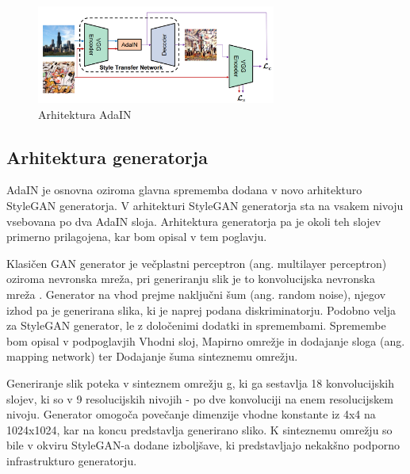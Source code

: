 \documentclass[a4paper,12pt,openright]{book}
\begin{document}
\begin{figure}[htb]
\begin{center}
  \includegraphics[width=0.7\textwidth]{images/adain_architecture.png}
\end{center}
  \caption{Arhitektura AdaIN}
  \label{AdaIN}
\end{figure}


\subsection{Arhitektura generatorja}
AdaIN je osnovna oziroma glavna sprememba dodana v novo arhitekturo StyleGAN generatorja. 
V arhitekturi StyleGAN generatorja sta na vsakem nivoju vsebovana po dva AdaIN sloja. Arhitektura generatorja pa je okoli teh slojev primerno prilagojena, kar bom opisal v tem poglavju.

Klasičen GAN generator je večplastni perceptron (ang. multilayer perceptron) oziroma nevronska mreža, pri generiranju slik je to konvolucijska nevronska mreža \cite{karras2017progressive}. Generator na vhod prejme naključni šum (ang. random noise), njegov izhod pa je generirana slika, ki je naprej podana diskriminatorju. Podobno velja za StyleGAN generator, le z določenimi dodatki in spremembami. Spremembe bom opisal v podpoglavjih Vhodni sloj, Mapirno omrežje in dodajanje sloga (ang. mapping network) ter Dodajanje šuma sinteznemu omrežju.

Generiranje slik poteka v sinteznem omrežju g, ki ga sestavlja 18 konvolucijskih slojev, ki so v 9 resolucijskih nivojih - po dve konvoluciji na enem resolucijskem nivoju. Generator omogoča povečanje dimenzije vhodne konstante iz 4x4 na 1024x1024, kar na koncu predstavlja generirano sliko. K sinteznemu omrežju so bile v okviru StyleGAN-a dodane izboljšave, ki predstavljajo nekakšno podporno infrastrukturo generatorju. 
\end{document}

